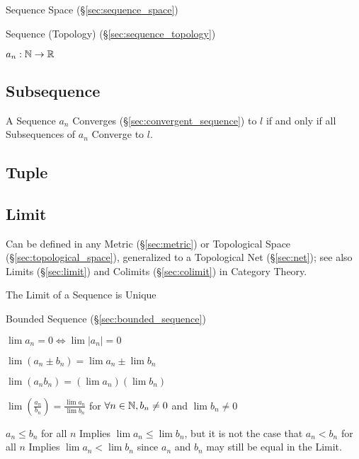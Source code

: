 Sequence Space (\S\ref{sec:sequence_space})

Sequence (Topology) (\S\ref{sec:sequence_topology})

$a_n : \mathbb{N} \rightarrow \mathbb{R}$



\subsection{Subsequence}\label{sec:subsequence}

A Sequence $a_n$ Converges (\S\ref{sec:convergent_sequence}) to $l$
if and only if all Subsequences of $a_n$ Converge to $l$.



\subsection{Tuple}\label{sec:tuple}

\subsection{Limit}\label{sec:sequence_limit}

Can be defined in any Metric (\S\ref{sec:metric}) or Topological Space
(\S\ref{sec:topological_space}), generalized to a Topological Net
(\S\ref{sec:net}); see also Limits (\S\ref{sec:limit}) and Colimits
(\S\ref{sec:colimit}) in Category Theory.

The Limit of a Sequence is Unique

Bounded Sequence (\S\ref{sec:bounded_sequence})

$\lim a_n = 0 \Leftrightarrow \lim |a_n| = 0$

$\lim (a_n \pm b_n) = \lim a_n \pm \lim b_n$

$\lim (a_n b_n) = (\lim a_n) (\lim b_n)$

$\lim (\frac{a_n}{b_n}) = \frac{\lim a_n}{\lim b_n}$ for $\forall
n \in \mathbb{N}, b_n \neq 0$ and $\lim b_n \neq 0$

$a_n \leq b_n$ for all $n$ Implies $\lim a_n \leq \lim b_n$, but it is
not the case that $a_n < b_n$ for all $n$ Implies $\lim a_n < \lim
b_n$ since $a_n$ and $b_n$ may still be equal in the Limit.

